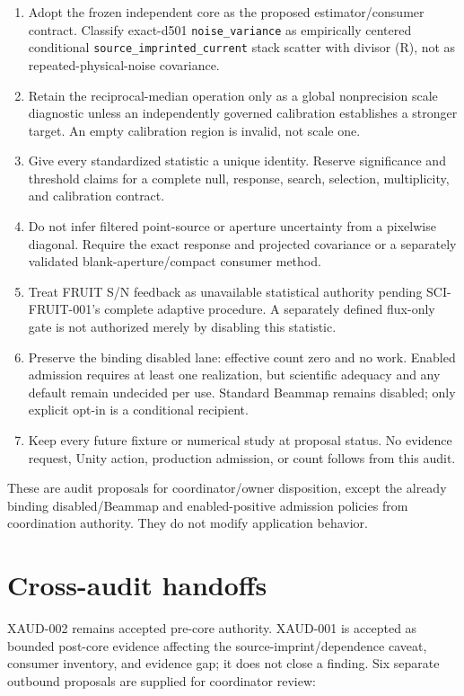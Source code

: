 \documentclass[11pt]{article}
\newcommand{\code}[1]{\nolinkurl{#1}}
\begin{document}
\begin{enumerate}[label=\textbf{SCI-NOI-002-D00\arabic*.}]
\item Adopt the frozen independent core as the proposed estimator/consumer
contract.  Classify exact-d501 \code{noise_variance} as empirically centered
conditional \code{source_imprinted_current} stack scatter with divisor (R),
not as repeated-physical-noise covariance.
\item Retain the reciprocal-median operation only as a global nonprecision
scale diagnostic unless an independently governed calibration establishes a
stronger target.  An empty calibration region is invalid, not scale one.
\item Give every standardized statistic a unique identity.  Reserve
significance and threshold claims for a complete null, response, search,
selection, multiplicity, and calibration contract.
\item Do not infer filtered point-source or aperture uncertainty from a
pixelwise diagonal.  Require the exact response and projected covariance or a
separately validated blank-aperture/compact consumer method.
\item Treat FRUIT S/N feedback as unavailable statistical authority pending
SCI-FRUIT-001's complete adaptive procedure.  A separately defined flux-only
gate is not authorized merely by disabling this statistic.
\item Preserve the binding disabled lane: effective count zero and no work.
Enabled admission requires at least one realization, but scientific adequacy
and any default remain undecided per use.  Standard Beammap remains disabled;
only explicit opt-in is a conditional recipient.
\item Keep every future fixture or numerical study at proposal status.  No
evidence request, Unity action, production admission, or count follows from
this audit.
\end{enumerate}

These are audit proposals for coordinator/owner disposition, except the
already binding disabled/Beammap and enabled-positive admission policies from
coordination authority.  They do not modify application behavior.

\section{Cross-audit handoffs}

XAUD-002 remains accepted pre-core authority.  XAUD-001 is accepted as bounded
post-core evidence affecting the source-imprint/dependence caveat, consumer
inventory, and evidence gap; it does not close a finding.  Six separate
outbound proposals are supplied for coordinator review:
\end{document}
